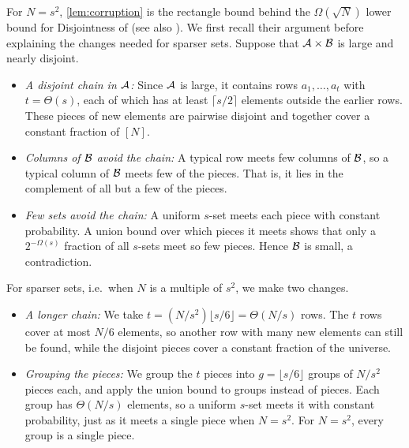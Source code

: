 For $N = s^2$, \cref{lem:corruption} is the rectangle bound behind the $\Omega(\sqrt N)$ lower bound for Disjointness of \cite{babai_complexity_1986} (see also \cite[Section~3.2, proof of Theorem~6]{chattopadhyay_story_2010}). We first recall their argument before explaining the changes needed for sparser sets. Suppose that $\mathcal{A} \times \mathcal{B}$ is large and nearly disjoint.
\begin{itemize}[leftmargin=*]
  \item \emph{A disjoint chain in $\mathcal{A}$:} Since $\mathcal{A}$ is large, it contains rows $a_1, \dots, a_t$ with $t = \Theta(s)$, each of which has at least $\lceil s/2\rceil$ elements outside the earlier rows. These pieces of new elements are pairwise disjoint and together cover a constant fraction of $[N]$.
  \item \emph{Columns of $\mathcal{B}$ avoid the chain:} A typical row meets few columns of $\mathcal{B}$, so a typical column of $\mathcal{B}$ meets few of the pieces. That is, it lies in the complement of all but a few of the pieces.
  \item \emph{Few sets avoid the chain:} A uniform $s$-set meets each piece with constant probability. A union bound over which pieces it meets shows that only a $2^{-\Omega(s)}$ fraction of all $s$-sets meet so few pieces. Hence $\mathcal{B}$ is small, a contradiction.
\end{itemize}
For sparser sets, i.e.\ when $N$ is a multiple of $s^2$, we make two changes.
\begin{itemize}[leftmargin=*]
  \item \emph{A longer chain:} We take $t=(N/s^2)\lfloor s/6\rfloor=\Theta(N/s)$ rows. The $t$ rows cover at most $N/6$ elements, so another row with many new elements can still be found, while the disjoint pieces cover a constant fraction of the universe.
  \item \emph{Grouping the pieces:} We group the $t$ pieces into $g=\lfloor s/6\rfloor$ groups of $N/s^2$ pieces each, and apply the union bound to groups instead of pieces. Each group has $\Theta(N/s)$ elements, so a uniform $s$-set meets it with constant probability, just as it meets a single piece when $N=s^2$. For $N = s^2$, every group is a single piece.
\end{itemize}

